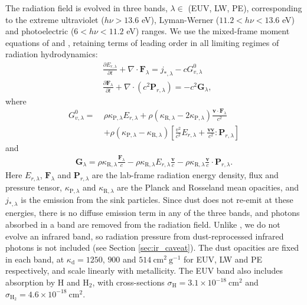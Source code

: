 \documentclass[twocolumn,linenumbers]{aastex631}
\begin{document}
The radiation field is evolved in three bands, $\lambda \in$ (EUV, LW, PE), corresponding to the extreme ultraviolet ($h\nu > 13.6$ eV), Lyman-Werner ($11.2 < h\nu < 13.6$ eV) and photoelectric ($6 < h\nu < 11.2$ eV) ranges. We use the mixed-frame moment equations of \citet{2023MNRAS.521.5160M} and \citet{2022MNRAS.512..401M}, retaining terms of leading order in all limiting regimes of radiation hydrodynamics:
\begin{align}
& \frac{\partial E_{r,\lambda}}{\partial t} + \nabla \cdot \mathbf{F}_\lambda = j_{*,\lambda} - cG^0_{v,\lambda} \\
& \frac{\partial \mathbf{F}_\lambda}{\partial t} + \nabla \cdot (c^2 \mathbf{P}_{r,\lambda}) = -c^2 \mathbf{G}_\lambda,
\end{align}
where
\begin{align}
G_{v,\lambda}^0 = \ & \rho \kappa_{\mathrm{P},\lambda} E_{r,\lambda} + \rho (\kappa_{\mathrm{R},\lambda} - 2\kappa_{\mathrm{P},\lambda}) \frac{\mathbf{v} \cdot \mathbf{F}_\lambda}{c^2} \nonumber\\
& + \rho (\kappa_{\mathrm{P},\lambda} - \kappa_{\mathrm{R},\lambda}) \left[ \frac{v^2}{c^2} E_{r,\lambda} + \frac{\mathbf{vv}}{c^2} : \mathbf{P}_{r,\lambda} \right]
\end{align}
and
\begin{align}\label{eq:G}
\mathbf{G}_\lambda = \rho \kappa_{\mathrm{R},\lambda} \frac{\mathbf{F}_\lambda}{c} - \rho \kappa_{\mathrm{R},\lambda} E_{r,\lambda} \frac{\mathbf{v}}{c} - \rho \kappa_{\mathrm{R},\lambda} \frac{\mathbf{v}}{c} \cdot \mathbf{P}_{r,\lambda}.
\end{align}
Here $E_{r,\lambda}$, $\mathbf{F}_\lambda$ and $\mathbf{P}_{r,\lambda}$ are the lab-frame radiation energy density, flux and pressure tensor, $\kappa_{\mathrm{P},\lambda}$ and $\kappa_{\mathrm{R},\lambda}$ are the Planck and Rosseland mean opacities, and $j_{*,\lambda}$ is the emission from the sink particles. Since dust does not re-emit at these energies, there is no diffuse emission term in any of the three bands, and photons absorbed in a band are removed from the radiation field. Unlike \citet{2023MNRAS.521.5160M}, we do not evolve an infrared band, so radiation pressure from dust-reprocessed infrared photons is not included (see Section \ref{sec:ir_caveat}). The dust opacities are fixed in each band, at $\kappa_\mathrm{d} = 1250$, $900$ and $514\ \mathrm{cm^2\ g^{-1}}$ for EUV, LW and PE respectively, and scale linearly with metallicity. The EUV band also includes absorption by H and H$_2$, with cross-sections $\sigma_\mathrm{H} = 3.1\times10^{-18}\ \mathrm{cm^2}$ and $\sigma_\mathrm{H_2} = 4.6\times10^{-18}\ \mathrm{cm^2}$.
\end{document}
